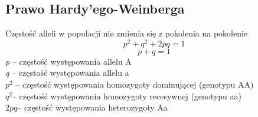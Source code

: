 \begin{flushleft}
\subsection{Prawo Hardy’ego-Weinberga }
 Częstość alleli w populacji nie zmienia się z pokolenia na pokolenie
\[p^2 + q^2 +2pq =1\]
\[p + q = 1\]
\textit{p} – częstość występowania allelu A\\
\textit{q} – częstość występowania allelu a\\
$p^2$ – częstość występowania homozygoty dominującej (genotypu AA)\\
$q^2$– częstość występowania homozygoty recesywnej (genotypu aa)\\
$2pq$– częstość występowania heterozygoty Aa\\
\end{flushleft}